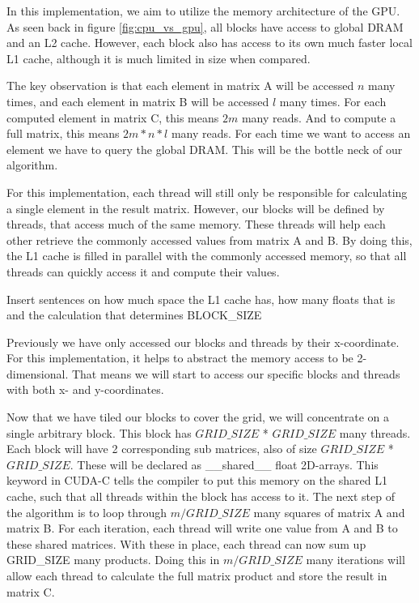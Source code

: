 In this implementation, we aim to utilize the memory architecture of the GPU. As seen back in figure \ref{fig:cpu_vs_gpu}, all blocks have access to global DRAM and an L2 cache. However, each block also has access to its own much faster local L1 cache, although it is much limited in size when compared. 

The key observation is that each element in matrix A will be accessed $n$ many times, and each element in matrix B will be accessed $l$ many times. For each computed element in matrix C, this means $2m$ many reads. And to compute a full matrix, this means $2m * n * l$ many reads. For each time we want to access an element we have to query the global DRAM. This will be the bottle neck of our algorithm. 

For this implementation, each thread will still only be responsible for calculating a single element in the result matrix. However, our blocks will be defined by threads, that access much of the same memory. These threads will help each other retrieve the commonly accessed values from matrix A and B. By doing this, the L1 cache is filled in parallel with the commonly accessed memory, so that all threads can quickly access it and compute their values. 


\color{red} Insert sentences on how much space the L1 cache has, how many floats that is and the calculation that determines BLOCK\_SIZE \color{black}

Previously we have only accessed our blocks and threads by their x-coordinate. For this implementation, it helps to abstract the memory access to be 2-dimensional. That means we will start to access our specific blocks and threads with both x- and y-coordinates. 

Now that we have tiled our blocks to cover the grid, we will concentrate on a single arbitrary block. This block has $GRID\_SIZE$ * $GRID\_SIZE$ many threads. Each block will have 2 corresponding sub matrices, also of size $GRID\_SIZE$ * $GRID\_SIZE$. These will be declared as \_\_shared\_\_ float 2D-arrays. This keyword in CUDA-C tells the compiler to put this memory on the shared L1 cache, such that all threads within the block has access to it. 
The next step of the algorithm is to loop through $m / GRID\_SIZE$ many squares of matrix A and matrix B. For each iteration, each thread will write one value from A and B to these shared matrices. With these in place, each thread can now sum up GRID\_SIZE many products. Doing this in $m / GRID\_SIZE$ many iterations will allow each thread to calculate the full matrix product and store the result in matrix C. 


